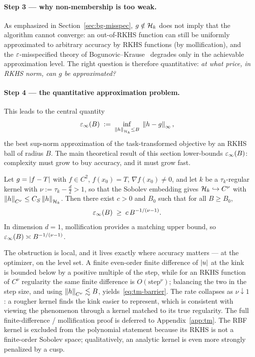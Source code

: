 \paragraph{Step 3 --- why non-membership is too weak.}
As emphasized in Section~\ref{sec:bg-misspec}, $g\notin\mathcal{H}_k$ does not imply that
the algorithm cannot converge: an out-of-RKHS function can still be uniformly
approximated to arbitrary accuracy by RKHS functions (by mollification), and the
$\varepsilon$-misspecified theory of Bogunovic--Krause~\cite{bogunovic2021} degrades
only in the achievable approximation level. The right question is therefore
quantitative: \emph{at what price, in RKHS norm, can $g$ be approximated?}

\paragraph{Step 4 --- the quantitative approximation problem.}
This leads to the central quantity
\begin{equation}
  \varepsilon_{\infty}(B) \;:=\; \inf_{\left\lVert h\right\rVert_{\mathcal{H}_k}\le B}\;\left\lVert h-g\right\rVert_\infty,
  \label{eq:tm-epsinf}
\end{equation}
the best sup-norm approximation of the task-transformed objective by an RKHS ball
of radius $B$. The main theoretical result of this section lower-bounds
$\varepsilon_{\infty}(B)$: complexity must grow to buy accuracy, and it must grow fast.

\begin{theorem}
\label{thm:tm-barrier}
Let $g=\left\lvert f-T\right\rvert$ with $f\in C^2$, $f(x_0)=T$, $\nabla f(x_0)\neq0$, and let $k$
be a $\tau_k$-regular kernel with $\nu:=\tau_k-\tfrac d2>1$, so that the Sobolev
embedding gives $\mathcal{H}_k\hookrightarrow C^\nu$ with
$\left\lVert h\right\rVert_{C^\nu}\le C_S\left\lVert h\right\rVert_{\mathcal{H}_k}$. Then there exist $c>0$ and $B_0$ such that
for all $B\ge B_0$,
\begin{equation}
  \varepsilon_{\infty}(B)\;\ge\; c\,B^{-1/(\nu-1)}.
  \label{eq:tm-barrier}
\end{equation}
In dimension $d=1$, mollification provides a matching upper bound, so
$\varepsilon_{\infty}(B)\asymp B^{-1/(\nu-1)}$.
\end{theorem}

\begin{remark}
The obstruction is local, and it lives exactly where accuracy matters --- at the
optimizer, on the level set. A finite even-order finite difference of $\left\lvert u\right\rvert$
at the kink is bounded below by a positive multiple of the step, while for an
RKHS function of $C^\nu$ regularity the same finite difference is
$O(\text{step}^\nu)$; balancing the two in the step size, and using
$\left\lVert h\right\rVert_{C^\nu}\lesssim B$, yields~\eqref{eq:tm-barrier}. The rate collapses as
$\nu\downarrow1$: a rougher kernel finds the kink easier to represent, which is
consistent with viewing the phenomenon through a kernel matched to its true
regularity. The full finite-difference / mollification proof is deferred to
Appendix~\ref{app:tm}. The RBF kernel is excluded from the polynomial statement
because its RKHS is not a finite-order Sobolev space; qualitatively, an analytic
kernel is even more strongly penalized by a cusp.
\end{remark}

